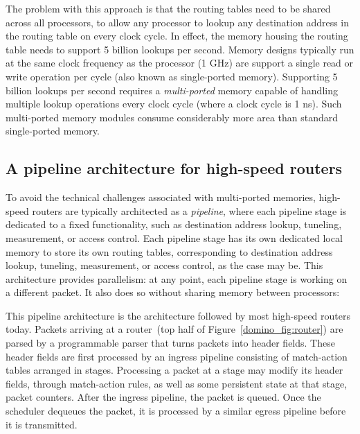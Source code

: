 The problem with this approach is that the routing tables need to be shared
across all processors, to allow any processor to lookup any destination address
in the routing table on every clock cycle. In effect, the memory housing the
routing table needs to support 5 billion lookups per second. Memory designs
typically run at the same clock frequency as the processor (1 GHz) are support
a single read or write operation per cycle (also known as single-ported
memory). Supporting 5 billion lookups per second requires a {\em multi-ported}
memory capable of handling multiple lookup operations every clock cycle (where
a clock cycle is 1 ns). Such multi-ported memory modules consume considerably
more area than standard single-ported memory.

\subsection{A pipeline architecture for high-speed routers}
To avoid the technical challenges associated with multi-ported memories,
high-speed routers are typically architected as a {\em pipeline}, where each
pipeline stage is dedicated to a fixed functionality, such as destination
address lookup, tuneling, measurement, or access control. Each pipeline stage
has its own dedicated local memory to store its own routing tables,
corresponding to destination address lookup, tuneling, measurement, or access
control, as the case may be. This architecture provides parallelism: at any
point, each pipeline stage is working on a different packet. It also does so
without sharing memory between processors: 


This pipeline architecture is the architecture followed by most high-speed
routers today. Packets arriving at a router~(top half of
Figure~\ref{domino_fig:router}) are parsed by a programmable parser that turns
packets into header fields. These header fields are first processed by an
ingress pipeline consisting of match-action tables arranged in stages.
Processing a packet at a stage may modify its header fields, through
match-action rules, as well as some persistent state at that stage, \eg packet
counters. After the ingress pipeline, the packet is queued. Once the scheduler
dequeues the packet, it is processed by a similar egress pipeline before it is
transmitted.

